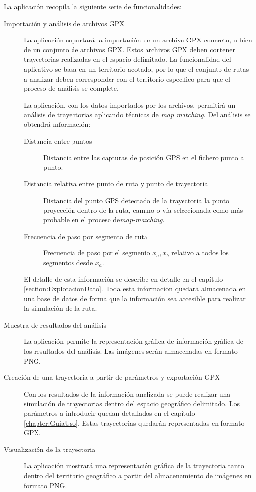 La aplicación recopila la siguiente serie de funcionalidades:
\begin{description}
\item [Importación y análisis de archivos \ac{GPX}] La aplicación soportará la importación de un archivo GPX concreto, o bien de un conjunto de archivos GPX. Estos archivos GPX deben contener trayectorias realizadas en el espacio delimitado. La funcionalidad del aplicativo se basa en un territorio acotado, por lo que el conjunto de rutas a analizar deben corresponder con el territorio especifico para que el proceso de análisis 
se complete. 

La aplicación, con los datos importados por los archivos, permitirá un análisis de trayectorias aplicando técnicas de \textit{map matching}. Del análisis se obtendrá información:
\begin{description} 
\item[Distancia entre puntos]  Distancia entre las capturas de posición \ac{GPS} en el fichero punto a punto.
\item[Distancia relativa entre punto de ruta y punto de trayectoria] Distancia del punto \ac{GPS} detectado 
de la trayectoria la punto proyección dentro de la ruta, camino o vía seleccionada como más probable en el proceso de\textit{map-matching}.
\item[Frecuencia de paso por segmento de ruta] Frecuencia de paso por el segmento $x_{a}, x_{b}$ relativo 
a todos los segmentos desde $x_{a}$.
\end{description}
El detalle de esta información se describe en detalle en el capítulo \ref{section:ExplotacionDato}. Toda esta información quedará almacenada en una base de datos de forma que la información sea accesible para realizar la simulación de la ruta.
\item [Muestra de resultados del análisis] La aplicación permite la representación gráfica de información gráfica de los resultados del análisis. Las  imágenes serán almacenadas en formato \ac{PNG}.
\item [Creación de una trayectoria a partir de parámetros y exportación \ac{GPX}] Con los resultados de la información analizada se puede realizar una simulación de trayectorias dentro del espacio geográfico delimitado. Los parámetros a introducir quedan detallados en el capítulo \ref{chapter:GuiaUso}. Estas trayectorias quedarán representadas en formato \ac{GPX}. 
\item [Visualización de la trayectoria] La aplicación mostrará una representación gráfica de la trayectoria tanto   dentro del territorio geográfico a partir del almacenamiento de imágenes en formato  \ac{PNG}.
\end{description}


